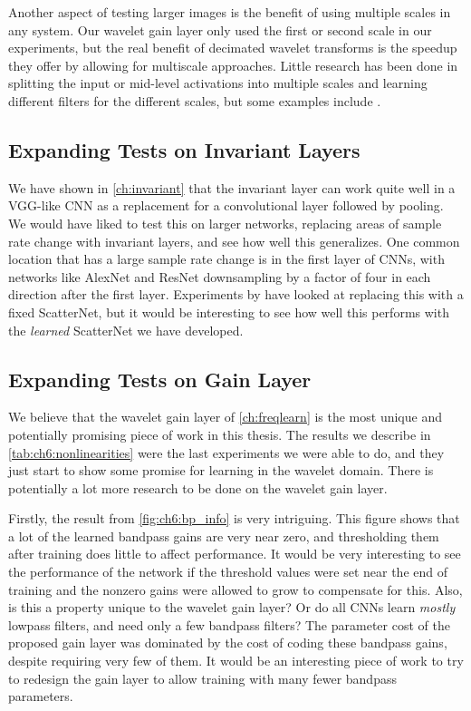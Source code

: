 Another aspect of testing larger images is the benefit of using multiple
scales in any system. Our wavelet gain layer only used the first or second scale
in our experiments, but the real benefit of decimated wavelet transforms is the
speedup they offer by allowing for multiscale approaches. Little research has
been done in splitting the input or mid-level activations into multiple scales
and learning different filters for the different scales, but some examples
include \cite{haber_learning_2017, fujieda_wavelet_2018}.

\subsection{Expanding Tests on Invariant Layers}
We have shown in \autoref{ch:invariant} that the invariant layer can work quite
well in a VGG-like CNN as a replacement for a convolutional layer followed by
pooling. We would have liked to test this on larger networks, replacing areas of
sample rate change with invariant layers, and see how well
this generalizes. One common location that has a large sample rate change is in the first layer of
CNNs, with networks like AlexNet and ResNet downsampling by a
factor of four in each direction after the first layer. Experiments by
\citeauthor{oyallon_scaling_2017} \cite{oyallon_scaling_2017} have looked at replacing this with a fixed
ScatterNet, but it would be interesting to see how well this performs with the
\emph{learned} ScatterNet we have developed.

\subsection{Expanding Tests on Gain Layer}
We believe that the wavelet gain layer of \autoref{ch:freqlearn} is the most
unique and potentially promising piece of work in this thesis. The results we
describe in \autoref{tab:ch6:nonlinearities}
were the last experiments we were able to do, and they just start to show some
promise for learning in the wavelet domain. There is potentially a lot more
research to be done on the wavelet gain layer.

Firstly, the result from \autoref{fig:ch6:bp_info} is very intriguing. This
figure shows that a lot of the learned bandpass gains are very near zero,
and thresholding them after training does little to affect performance. It would
be very interesting to see the performance of the network if the threshold
values were set near the end of training and the nonzero gains were allowed to
grow to compensate for this. Also, is this a property unique to the wavelet gain
layer? Or do all CNNs learn \emph{mostly} lowpass filters, and need only a few
bandpass filters? The parameter cost of the proposed gain layer was dominated
by the cost of coding these bandpass gains, despite requiring very few of them.
It would be an interesting piece of work to try to redesign the gain layer to
allow training with many fewer bandpass parameters.

